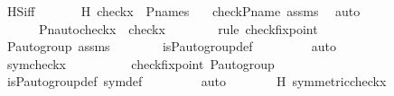 \begin{isabellebody}
\ HS{\isacharunderscore}{\kern0pt}iff\ \isanewline
\ \ \ \ \isamarkupfalse%
\ H{}{\isacharcolon}{\kern0pt}\ {\isachardoublequoteopen}check{\isacharparenleft}{\kern0pt}x{\isacharparenright}{\kern0pt}\ {\isasymin}\ P{\isacharunderscore}{\kern0pt}names{\isachardoublequoteclose}\ \ \isamarkupfalse%
\ check{\isacharunderscore}{\kern0pt}P{\isacharunderscore}{\kern0pt}name\ assms\ \isamarkupfalse%
\ auto\isanewline
\ \ \ \ \isamarkupfalse%
\ {\isachardoublequoteopen}{\isasymAnd}{\isasympi}{\isachardot}{\kern0pt}\ {\isasympi}\ {\isasymin}\ {\isasymG}\ {\isasymLongrightarrow}\ Pn{\isacharunderscore}{\kern0pt}auto{\isacharparenleft}{\kern0pt}{\isasympi}{\isacharparenright}{\kern0pt}{\isacharbackquote}{\kern0pt}check{\isacharparenleft}{\kern0pt}x{\isacharparenright}{\kern0pt}\ {\isacharequal}{\kern0pt}\ check{\isacharparenleft}{\kern0pt}x{\isacharparenright}{\kern0pt}{\isachardoublequoteclose}\ \isanewline
\ \ \ \ \ \ \isamarkupfalse%
{\isacharparenleft}{\kern0pt}rule\ check{\isacharunderscore}{\kern0pt}fixpoint{\isacharparenright}{\kern0pt}\ \isanewline
\ \ \ \ \ \ \isamarkupfalse%
\ {\isasymG}{\isacharunderscore}{\kern0pt}P{\isacharunderscore}{\kern0pt}auto{\isacharunderscore}{\kern0pt}group\ assms\isanewline
\ \ \ \ \ \ \isamarkupfalse%
\ is{\isacharunderscore}{\kern0pt}P{\isacharunderscore}{\kern0pt}auto{\isacharunderscore}{\kern0pt}group{\isacharunderscore}{\kern0pt}def\ \isanewline
\ \ \ \ \ \ \isamarkupfalse%
\ auto\isanewline
\ \ \ \ \isamarkupfalse%
\ \isamarkupfalse%
\ {\isachardoublequoteopen}sym{\isacharparenleft}{\kern0pt}check{\isacharparenleft}{\kern0pt}x{\isacharparenright}{\kern0pt}{\isacharparenright}{\kern0pt}\ {\isacharequal}{\kern0pt}\ {\isasymG}{\isachardoublequoteclose}\isanewline
\ \ \ \ \ \ \isamarkupfalse%
\ check{\isacharunderscore}{\kern0pt}fixpoint\ {\isasymG}{\isacharunderscore}{\kern0pt}P{\isacharunderscore}{\kern0pt}auto{\isacharunderscore}{\kern0pt}group\ \ \isanewline
\ \ \ \ \ \ \isamarkupfalse%
\ is{\isacharunderscore}{\kern0pt}P{\isacharunderscore}{\kern0pt}auto{\isacharunderscore}{\kern0pt}group{\isacharunderscore}{\kern0pt}def\ sym{\isacharunderscore}{\kern0pt}def\ \isanewline
\ \ \ \ \ \ \isamarkupfalse%
\ auto\isanewline
\ \ \ \ \isamarkupfalse%
\ \isamarkupfalse%
\ H{}{\isacharcolon}{\kern0pt}\ {\isachardoublequoteopen}symmetric{\isacharparenleft}{\kern0pt}check{\isacharparenleft}{\kern0pt}x{\isacharparenright}{\kern0pt}{\isacharparenright}{\kern0pt}{\isachardoublequoteclose}\ \isanewline

\end{isabellebody}
